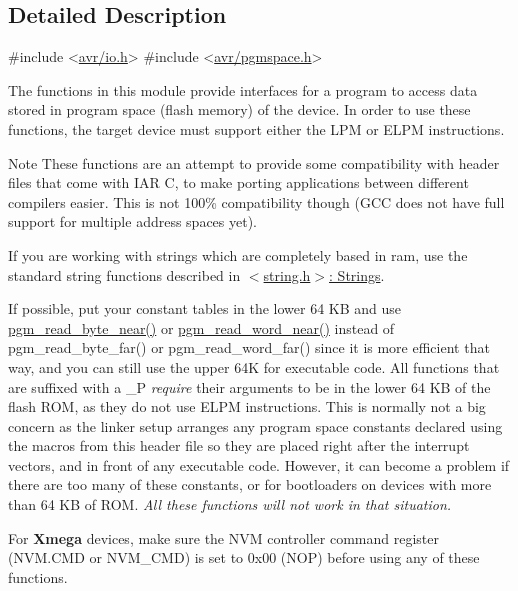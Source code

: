 \subsection{Detailed Description}

\begin{DoxyCode}
\textcolor{preprocessor}{#include <\hyperlink{io_8h}{avr/io.h}>}
\textcolor{preprocessor}{#include <\hyperlink{pgmspace_8h}{avr/pgmspace.h}>}
\end{DoxyCode}


The functions in this module provide interfaces for a program to access data stored in program space (flash memory) of the device. In order to use these functions, the target device must support either the {\ttfamily L\+PM} or {\ttfamily E\+L\+PM} instructions.

\begin{DoxyNote}{Note}
These functions are an attempt to provide some compatibility with header files that come with I\+AR C, to make porting applications between different compilers easier. This is not 100\% compatibility though (G\+CC does not have full support for multiple address spaces yet).

If you are working with strings which are completely based in ram, use the standard string functions described in \hyperlink{group__avr__string}{$<$string.\+h$>$\+: Strings}.

If possible, put your constant tables in the lower 64 KB and use \hyperlink{group__avr__pgmspace_ga88d7dd4863f87530e1a34ece430a587c}{pgm\+\_\+read\+\_\+byte\+\_\+near()} or \hyperlink{group__avr__pgmspace_gaf51eeaa847dd2668d2a66b70ecfb7398}{pgm\+\_\+read\+\_\+word\+\_\+near()} instead of pgm\+\_\+read\+\_\+byte\+\_\+far() or pgm\+\_\+read\+\_\+word\+\_\+far() since it is more efficient that way, and you can still use the upper 64K for executable code. All functions that are suffixed with a {\ttfamily \+\_\+P} {\itshape require} their arguments to be in the lower 64 KB of the flash R\+OM, as they do not use E\+L\+PM instructions. This is normally not a big concern as the linker setup arranges any program space constants declared using the macros from this header file so they are placed right after the interrupt vectors, and in front of any executable code. However, it can become a problem if there are too many of these constants, or for bootloaders on devices with more than 64 KB of R\+OM. {\itshape All these functions will not work in that situation.}

For {\bfseries Xmega} devices, make sure the N\+VM controller command register ({\ttfamily N\+V\+M.\+C\+MD} or {\ttfamily N\+V\+M\+\_\+\+C\+MD}) is set to 0x00 (N\+OP) before using any of these functions. 
\end{DoxyNote}


